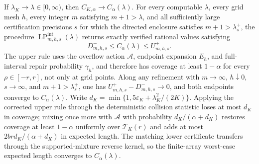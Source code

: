 If \(\lambda_K\to\lambda\in[0,\infty)\), then
\(C_{K,\alpha}\to C_\alpha(\lambda)\).  For every computable
\(\lambda\), every grid mesh \(h\), every integer \(m\) satisfying
\(m+1>\lambda\), and all sufficiently large certification precisions
\(s\) for which the directed enclosure satisfies
\(m+1>\lambda_s^+\), the procedure
\(\operatorname{LP}_{m,h,s}^{\mathrm{int}}(\lambda)\) returns exactly
verified rational values satisfying
\[
 D_{m,h,s}^-\le C_\alpha(\lambda)\le U_{m,h,s}^+.
\]
The upper rule uses the overflow action \(\mathcal A\), endpoint
expansion \(E_h\), and full-interval repair probability \(\gamma_h\),
and therefore has coverage at least \(1-\alpha\) for every
\(\rho\in[-r,r]\), not only at grid points.  Along any refinement with
\(m\to\infty\), \(h\downarrow0\), \(s\to\infty\), and
\(m+1>\lambda_s^+\), one has
\(U_{m,h,s}^+-D_{m,h,s}^-\to0\), and both endpoints converge to
\(C_\alpha(\lambda)\).  Write
\(d_K=\min\{1,5\varepsilon_K+\lambda_K^2/(2K)\}\).  Applying the
corrected upper rule through the deterministic collision statistic
loses at most \(d_K\) in coverage; mixing once more with
\(\mathcal A\) with probability \(d_K/(\alpha+d_K)\) restores coverage
at least \(1-\alpha\) uniformly over \(\mathcal T_K(r)\) and adds at
most \(2brd_K/(\alpha+d_K)\) in expected length.  The matching lower
certificate transfers through the supported-mixture reverse kernel,
so the finite-array worst-case expected length converges to
\(C_\alpha(\lambda)\).
